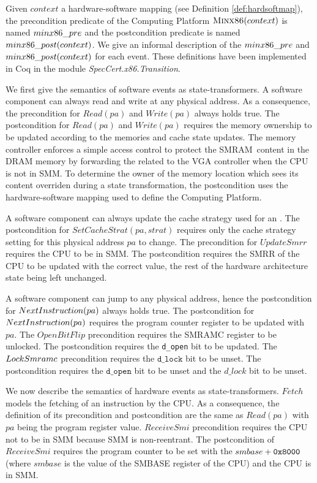 \label{page:minx86def} Given $context$ a hardware-software mapping (see
Definition \ref{def:hardsoftmap}), the precondition predicate of the Computing
Platform $\textsc{Minx86}(context)$ is named $min\-x86\_pre$ and the
postcondition predicate is named $min\-x86\_post(con\-text)$. We give an
informal description of the $min\-x86\_pre$ and $minx\-86\_post(context)$ for
each event. These definitions have been implemented in Coq in the module
\emph{Spec\-Cert.x86.Transi\-tion}.

We first give the semantics of software events as state-transformers. A software
component can always read and write at any physical address. As a consequence,
the precondition for $Read(pa)$ and $Write(pa)$ always holds true. The
postcondition for $Read(pa)$ and $Write(pa)$ requires the memory ownership to be
updated according to the memories and cache state updates. The memory controller
enforces a simple access control to protect the SMRAM content in the DRAM memory
by forwarding the related \IO to the VGA controller when the CPU is not in SMM.
To determine the owner of the memory location which sees its content overriden
during a state transformation, the postcondition uses the hardware-software
mapping used to define the Computing Platform.

A software component can always update the cache strategy used for an \IO. The
postcondition for $SetCacheStrat(pa,strat)$ requires only the cache strategy
setting for this physical address $pa$ to change. The precondition for
$UpdateSmrr$ requires the CPU to be in SMM. The postcondition requires the SMRR
of the CPU to be updated with the correct value, the rest of the hardware
architecture state being left unchanged.

A software component can jump to any physical address, hence the postcondition
for $NextInstru\-ction(pa)$ always holds true. The postcondition for
$NextInstru\-ction(pa)$ requires the program counter register to be updated with
$pa$. The $OpenBitFlip$ precondition requires the SMRAMC register to be
unlocked. The postcondition requires the \texttt{d\_open} bit to be updated. The
$Lock\-Smramc$ precondition requires the $\texttt{d\_lock}$ bit to be unset. The
postcondition requires the $\texttt{d\_open}$ bit to be unset and the $d\_lock$
bit to be unset.

We now describe the semantics of hardware events as state-transformers. $Fetch$
models the fetching of an instruction by the CPU. As a consequence, the
definition of its precondition and postcondition are the same as $Read(pa)$ with
$pa$ being the program register value.  $ReceiveSmi$ precondition requires the
CPU not to be in SMM because SMM is non-reentrant.  The postcondition of
$ReceiveSmi$ requires the program counter to be set with the
$smbase + \mathtt{0x8000}$ (where $smbase$ is the value of the SMBASE register of
the CPU) and the CPU is in SMM.

